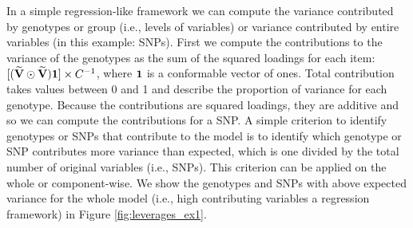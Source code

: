 \documentclass[12pt]{article}
\begin{document}
In a simple regression-like framework we can compute the variance
contributed by genotypes or group (i.e., levels of variables) or
variance contributed by entire variables (in this example: SNPs). First
we compute the contributions to the variance of the genotypes as the sum
of the squared loadings for each item:
\([(\widetilde{\bf V} \odot \widetilde{\bf V}){\bf 1}] \times C^{-1}\),
where \({\bf 1}\) is a conformable vector of ones. Total contribution
takes values between 0 and 1 and describe the proportion of variance for
each genotype. Because the contributions are squared loadings, they are
additive and so we can compute the contributions for a SNP. A simple
criterion to identify genotypes or SNPs that contribute to the model is
to identify which genotype or SNP contributes more variance than
expected, which is one divided by the total number of original variables
(i.e., SNPs). This criterion can be applied on the whole or
component-wise. We show the genotypes and SNPs with above expected
variance for the whole model (i.e., high contributing variables a
regression framework) in Figure \ref{fig:leverages_ex1}.
\end{document}
